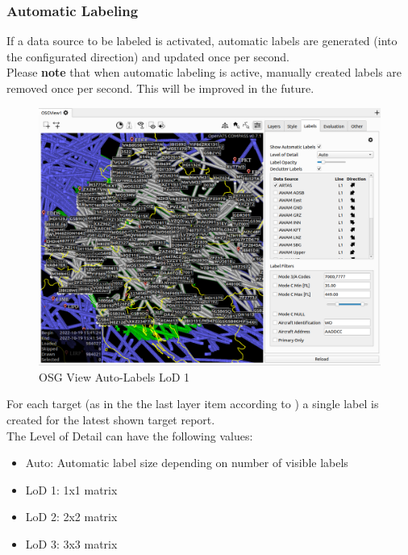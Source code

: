 \subsubsection{Automatic Labeling}

If a data source to be labeled is activated, automatic labels are generated (into the configurated direction) and updated once per second. \\

Please \textbf{note} that when automatic labeling is active, manually created labels are removed once per second. This will be improved in the future.

\begin{figure}[H]
    \hspace*{-2.5cm}
    \includegraphics[width=19cm,frame]{figures/osgview_label_lod1.png}
  \caption{OSG View Auto-Labels LoD 1}
\end{figure}

For each target (as in the the last layer item according to ) a single label is created for the latest shown target report. \\

The Level of Detail can have the following values:
\begin{itemize}
 \item Auto: Automatic label size depending on number of visible labels
 \item LoD 1: 1x1 matrix
 \item LoD 2: 2x2 matrix
 \item LoD 3: 3x3 matrix
\end{itemize} 
\ \\

